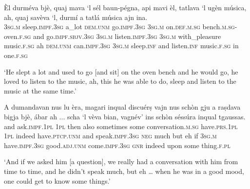 \begin{linenumbers}
\gll  Èl durméva bjè, quaj mava `l sél baun-pégna, api mavi èl, tatlava `l ugèn música, ah, quaj savèva `l, durmí a tatlá música ajn ina.\\
 \textsc{3sg.m} sleep.\textsc{impf.3sg} a\_lot \textsc{dem.unm} go.\textsc{impf.3sg} \textsc{3sg.m} on.\textsc{def.m.sg} bench.\textsc{m.sg}-oven.\textsc{f.sg} and go.\textsc{impf.sbjv.3sg} \textsc{3sg.m} listen.\textsc{impf.3sg} \textsc{3sg.m} with\_pleasure music.\textsc{f.sg} ah \textsc{dem.unm} can.\textsc{impf.3sg} \textsc{3sg.m} sleep.\textsc{inf} and listen.\textsc{inf} music.\textsc{f.sg} in one.\textsc{f.sg}  \\
\end{linenumbers}
\medskip
\glt `He slept a lot and used to go [and sit] on the oven bench and he would go, he loved to listen to the music, ah, this he was able to do, sleep and listen to the music at the same time.'
\medskip

\begin{linenumbers}
\gll  A dumandavan nus lu èra, magari inqual discuérṣ vajn nus schòn gju a raṣdava bigja bjè, ábar ah ... scha `l vèva bian, vagnév’ ins schòn séssúra inqual tgaussas.  \\
and ask.\textsc{impf.1pl} \textsc{1pl} then also sometimes some conversation.\textsc{m.sg} have.\textsc{prs.1pl} \textsc{1pl} indeed have.\textsc{ptcp.unm} and speak.\textsc{impf.3sg} \textsc{neg} much but eh {} if \textsc{3sg.m}  have.\textsc{impf.3sg} good.\textsc{adj.unm} come.\textsc{impf.3sg} \textsc{gnr} indeed upon some thing.\textsc{f.pl} \\
\end{linenumbers}
\medskip
\glt `And if we asked him [a question], we really had a conversation with him from time to time, and he didn’t speak much, but eh … when he was in a good mood, one could get to know some things.'
\medskip

